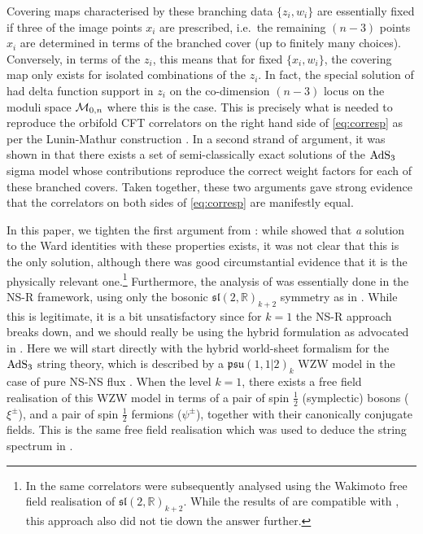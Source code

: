 \documentclass[a4paper,11pt]{article}
\numberwithin{equation}{section}
\begin{document}
Covering maps characterised by these branching data $\{ z_i, w_i \}$ are essentially fixed if three of the image points $x_i$ are prescribed, i.e.\ the remaining $(n-3)$ points $x_i$ are determined in terms of the branched cover (up to finitely many choices). Conversely, in terms of the $z_i$, this means that for fixed $\{x_i,w_i\}$, the covering map only exists for isolated combinations of the $z_i$. In fact, the special solution of \cite{Eberhardt:2019ywk} had delta function support in $z_i$ on the co-dimension $(n-3)$ locus on the moduli space ${\cal M}_{0,n}$ where this is the case. This is precisely what is needed to reproduce the orbifold CFT correlators on the right hand side of 
\eqref{eq:corresp} as per the Lunin-Mathur construction \cite{Lunin:2001, Pakman:2009}. In a second strand of argument, it was shown in \cite{Eberhardt:2019ywk} that there exists a set of semi-classically exact solutions of the ${\rm AdS}_3$ sigma model whose contributions reproduce the correct weight factors for each of these branched covers. Taken together, these two arguments gave strong evidence that the correlators on both sides of \eqref{eq:corresp} are manifestly equal. 
\smallskip

In this paper, we tighten the first argument from \cite{Eberhardt:2019ywk}: while \cite{Eberhardt:2019ywk} showed that \emph{a} solution to the Ward identities with these properties exists, it was not clear  that this is the only solution, although there was good circumstantial evidence that it is the physically relevant one.\footnote{In \cite{Hikida:2020kil} the same correlators were subsequently analysed using the Wakimoto free field realisation of $\mathfrak{sl}(2,\mathds{R})_{k+2}$. While the results of \cite{Hikida:2020kil} are compatible with \cite{Eberhardt:2019ywk}, this approach also did not tie down the answer further.}
 Furthermore, the analysis of \cite{Eberhardt:2019ywk} was essentially done in the NS-R framework, using only the bosonic $\mathfrak{sl}(2,\mathds{R})_{k+2}$ symmetry as in \cite{Maldacena:2000hw,Maldacena:2000kv,Maldacena:2001km}. While this is legitimate, it is a bit unsatisfactory since for $k=1$ the NS-R approach breaks down, and we should really be using the hybrid formulation as advocated in \cite{Eberhardt:2018ouy}.  Here we will start directly with the hybrid world-sheet formalism for the ${\rm AdS}_3$ string theory, which is described by a 
$\mathfrak{psu}(1,1|2)_k$ WZW model in the case of pure NS-NS flux \cite{Berkovits:1999im}. When the level $k=1$, there exists a free field realisation of this WZW model in terms of a pair of spin $\frac{1}{2}$ (symplectic) bosons ($\xi^{\pm}$), and a pair of spin $\frac{1}{2}$ fermions ($\psi^{\pm}$), together with their canonically conjugate fields. This is the same free field realisation which was used to deduce the string spectrum in  \cite{Eberhardt:2018ouy}. 
\end{document}
